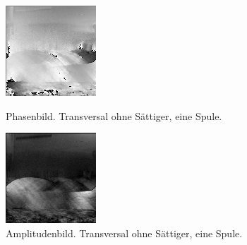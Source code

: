 \documentclass[
    11pt,
    ngerman
]{scrreprt}
\begin{document}
\begin{figure}[htbp]
    \begin{minipage}[htbp]{.45\textwidth}
        \centering
        \includegraphics[width=.9\textwidth]{Abbildungen/2015-03-13_5_1.png}
        \caption{Phasenbild. Transversal ohne Sättiger, eine Spule.}
        \label{fig:2015-03-13_5_1}
    \end{minipage}
    \hfill
    \begin{minipage}[htbp]{.45\textwidth}
        \centering
        \includegraphics[width=.9\textwidth]{Abbildungen/2015-03-13_4_1.png}
    \caption{Amplitudenbild. Transversal ohne Sättiger, eine Spule.}
        \label{fig:2015-03-13_4_1}
    \end{minipage}
\end{figure}
\end{document}
